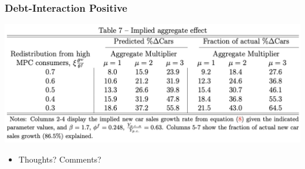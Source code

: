 \documentclass[english,xcolor=svgnames]{beamer}
\begin{document}
\begin{frame}
\frametitle[alignment=center]{Debt-Interaction Positive}
\centering
\includegraphics[scale=0.4]{figures/HRWTAB7.png}
\begin{itemize}
	\item Thoughts? Comments?
\end{itemize}
\end{frame}

%
%
\end{document}

